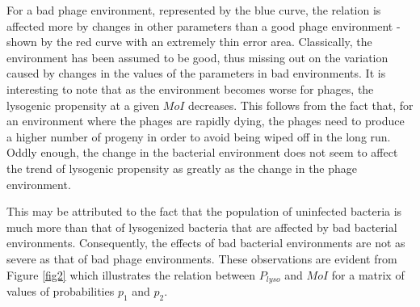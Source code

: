 \documentclass[12pt,letterpaper]{article}
\begin{document}
For a bad phage environment, represented by the blue curve, the relation is affected more by changes in other parameters than a good phage environment - shown by the red curve with an extremely thin error area. Classically, the environment has been assumed to be good, thus missing out on the variation caused by changes in the values of the parameters in bad environments. It is interesting to note that as the environment becomes worse for phages, the lysogenic propensity at a given $MoI$ decreases. This follows from the fact that, for an environment where the phages are rapidly dying, the phages need to produce a higher number of progeny in order to avoid being wiped off in the long run. Oddly enough, the change in the bacterial environment does not seem to affect the trend of lysogenic propensity as greatly as the change in the phage environment.

This may be attributed to the fact that the population of uninfected bacteria is much more than that of lysogenized bacteria that are affected by bad bacterial environments. Consequently, the effects of bad bacterial environments are not as severe as that of bad phage environments. These observations are evident from Figure \ref{fig2} which illustrates the relation between $P_{lyso}$ and $MoI$ for a matrix of values of probabilities $p_1$ and $p_2$.
\end{document}
